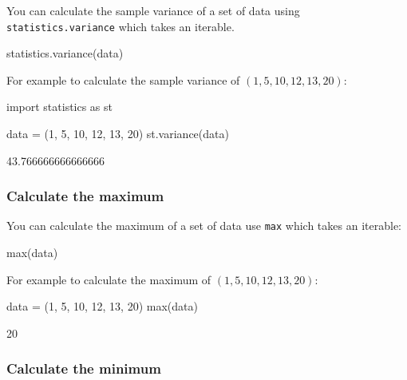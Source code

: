 You can calculate the sample variance of a set of data using \texttt{statistics.variance} which takes an
iterable.


\begin{api}
statistics.variance(data)
\end{api}



For example to calculate the sample variance of \((1, 5, 10, 12, 13, 20)\):




\begin{pyin}
import statistics as st

data = (1, 5, 10, 12, 13, 20)
st.variance(data)
\end{pyin}





\begin{raw}
43.766666666666666
\end{raw}





\subsubsection{Calculate the maximum}
\label{\detokenize{tools-for-mathematics/08-statistics/how/main:calculate-the-maximum}}

You can calculate the maximum of a set of data use \texttt{max} which takes an iterable:


\begin{api}
max(data)
\end{api}



For example to calculate the maximum of \((1, 5, 10, 12, 13, 20)\):




\begin{pyin}
data = (1, 5, 10, 12, 13, 20)
max(data)
\end{pyin}





\begin{raw}
20
\end{raw}





\subsubsection{Calculate the minimum}
\label{\detokenize{tools-for-mathematics/08-statistics/how/main:calculate-the-minimum}}

